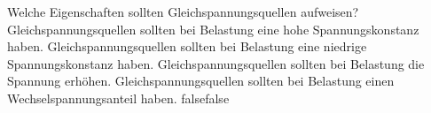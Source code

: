     {Welche Eigenschaften sollten Gleichspannungsquellen aufweisen?}
    {Gleichspannungsquellen sollten bei Belastung eine hohe Spannungskonstanz haben.}
    {Gleichspannungsquellen sollten bei Belastung eine niedrige Spannungskonstanz haben.}
    {Gleichspannungsquellen sollten bei Belastung die Spannung erhöhen.}
    {Gleichspannungsquellen sollten bei Belastung einen Wechselspannungsanteil haben.  }
    {false}{false}